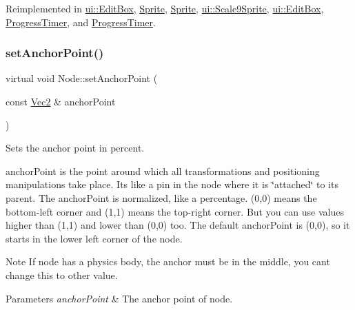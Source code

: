 Reimplemented in \hyperlink{classui_1_1EditBox_a6e433ab6bbaa15560a049dfe05087294}{ui\+::\+Edit\+Box}, \hyperlink{classSprite_a218c16399fb6c93f2f6dd7b29b54e238}{Sprite}, \hyperlink{classSprite_ace1c8b1ba17bcf1086730e192b914a78}{Sprite}, \hyperlink{classui_1_1Scale9Sprite_a7153fb170a630efc0748e0db6678963f}{ui\+::\+Scale9\+Sprite}, \hyperlink{classui_1_1EditBox_ad17a8fc58f78d77e47106170e6db9f39}{ui\+::\+Edit\+Box}, \hyperlink{classProgressTimer_a9f177a39d3158dd2f48f6558db5dcd02}{Progress\+Timer}, and \hyperlink{classProgressTimer_a2d83a3a9d2aa6a7d949a3800c82dfc68}{Progress\+Timer}.

\mbox{\label{classNode_aa861dc1d80a74801ee198a7a63a58a55}} 
\subsubsection{\texorpdfstring{set\+Anchor\+Point()}{setAnchorPoint()}\hspace{0.1cm}{\footnotesize\ttfamily [2/2]}}
{\footnotesize\ttfamily virtual void Node\+::set\+Anchor\+Point (\begin{DoxyParamCaption}\item[{const \hyperlink{classVec2}{Vec2} \&}]{anchor\+Point }\end{DoxyParamCaption})\hspace{0.3cm}{\ttfamily [virtual]}}

Sets the anchor point in percent.

anchor\+Point is the point around which all transformations and positioning manipulations take place. It\textquotesingle{}s like a pin in the node where it is \char`\"{}attached\char`\"{} to its parent. The anchor\+Point is normalized, like a percentage. (0,0) means the bottom-\/left corner and (1,1) means the top-\/right corner. But you can use values higher than (1,1) and lower than (0,0) too. The default anchor\+Point is (0,0), so it starts in the lower left corner of the node. \begin{DoxyNote}{Note}
If node has a physics body, the anchor must be in the middle, you can\textquotesingle{}t change this to other value.
\end{DoxyNote}

\begin{DoxyParams}{Parameters}
{\em anchor\+Point} & The anchor point of node. \\
\hline
\end{DoxyParams}


